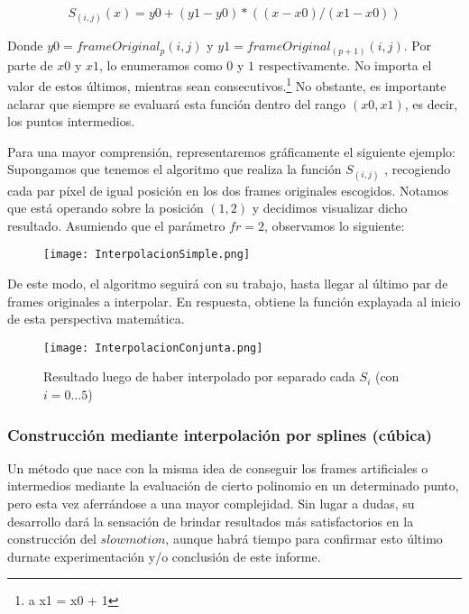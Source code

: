 \[
S_{(i,j)}(x) = y0 + (y1 - y0) * ( ( x - x0 ) / (x1 - x0) ) 
\]

Donde $y0 = frameOriginal_{p}(i,j)$ y $y1 = frameOriginal_{(p+1)}(i,j)$. Por parte de $x0$ y $x1$, lo enumeramos como $0$ y $1$ respectivamente. No importa el valor de estos \'ultimos, mientras sean consecutivos.\footnote{ a x1 = x0 + 1} No obstante, es importante aclarar que siempre se evaluar\'a esta funci\'on dentro del rango $(x0 ,x1)$, es decir, los puntos intermedios.

Para una mayor comprensi\'on, representaremos gr\'aficamente el siguiente ejemplo: Supongamos que tenemos el algoritmo que realiza la funci\'on $S_{(i,j)}$ , recogiendo cada par p\'ixel de igual posici\'on en los dos frames originales escogidos. Notamos que est\'a operando sobre la posici\'on $(1,2)$ y decidimos visualizar dicho resultado. Asumiendo que el par\'ametro $fr = 2$, observamos lo siguiente:

\begin{figure}[h!]
  \centering
    \texttt{[image: InterpolacionSimple.png]}
     \label{fig:intSimple}
\end{figure}
\noindent

De este modo, el algoritmo seguir\'a con su trabajo, hasta llegar al \'ultimo par de frames originales a interpolar. En respuesta, obtiene la funci\'on explayada al inicio de esta perspectiva matem\'atica.


\begin{figure}[h!]
  \centering
    \texttt{[image: InterpolacionConjunta.png]}
     \caption{Resultado luego de haber interpolado por separado cada $S_{i}$ (con $i = 0 \ldots 5$)}\label{fig:intConjunta}
\end{figure}
\noindent

\subsubsection{Construcción mediante interpolación por splines (c\'ubica)}

Un m\'etodo que nace con la misma idea de conseguir los frames artificiales o intermedios mediante la evaluaci\'on de cierto polinomio en un determinado punto, pero esta vez aferr\'andose a una mayor complejidad. Sin lugar a dudas, su desarrollo dar\'a la sensaci\'on de brindar resultados m\'as satisfactorios en la construcci\'on del $slowmotion$, aunque habr\'a tiempo para confirmar esto \'ultimo durnate experimentaci\'on y/o conclusi\'on de este informe.

